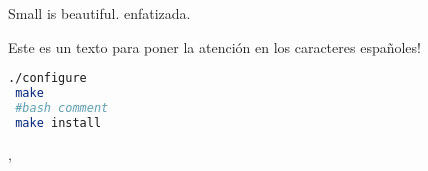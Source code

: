 \documentclass{article}
\begin{document}
Small is beautiful.\newline
\SWNT\newline
{} enfatizada.

Este es un texto para poner la atención en los caracteres españoles!

\begin{lstlisting}[backgroundcolor = \color{mfc_gray1},
                   language = bash]
 ./configure
 make 
 #bash comment
 make install
\end{lstlisting}

\begin{comment} 
Este es un comentario
multiline
gracias al verbatim package
\end{comment}

, 
\end{document}
